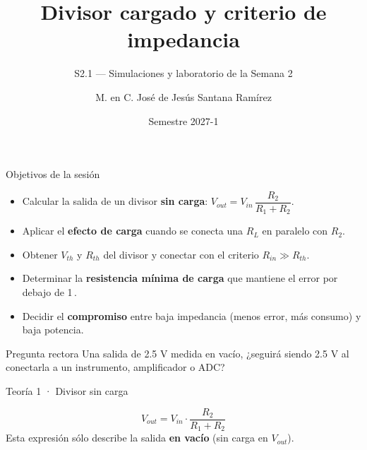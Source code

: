 \documentclass[aspectratio=169]{beamer}
\title[S2.1 · Divisor cargado]{Divisor cargado y criterio de impedancia}
\subtitle{S2.1 — Simulaciones y laboratorio de la Semana 2}
\institute{Licenciatura en Ingeniería Aeroespacial\\ UNAM · ENES Unidad Juriquilla}
\author{M. en C. José de Jesús Santana Ramírez}
\date{Semestre 2027-1}
\begin{document}
\begin{frame}[plain]
  \titlepage
\end{frame}

\begin{frame}{Objetivos de la sesión}
  \begin{itemize}
    \item Calcular la salida de un divisor \textbf{sin carga}: $V_{out} = V_{in}\,\dfrac{R_2}{R_1+R_2}$.
    \item Aplicar el \textbf{efecto de carga} cuando se conecta una $R_L$ en paralelo con $R_2$.
    \item Obtener $V_{th}$ y $R_{th}$ del divisor y conectar con el criterio $R_{in} \gg R_{th}$.
    \item Determinar la \textbf{resistencia mínima de carga} que mantiene el error por debajo de 1\,\text{\%}.
    \item Decidir el \textbf{compromiso} entre baja impedancia (menos error, más consumo) y baja potencia.
  \end{itemize}
  \pause
  \begin{block}{Pregunta rectora}
    Una salida de 2.5 V medida en vacío, ¿seguirá siendo 2.5 V al conectarla a un
    instrumento, amplificador o ADC?
  \end{block}
\end{frame}

\begin{frame}{Teoría 1 · Divisor sin carga}
  \begin{center}
  \end{center}
  \[
    V_{out} = V_{in}\cdot\frac{R_2}{R_1+R_2}
  \]
  \pause
  Esta expresión sólo describe la salida \textbf{en vacío} (sin carga en $V_{out}$).
\end{frame}
\end{document}
